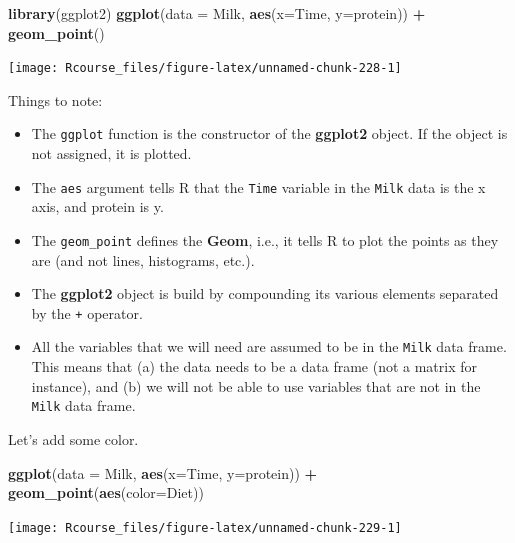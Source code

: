 \documentclass[]{book}
\newenvironment{Shaded}{\begin{snugshade}}{\end{snugshade}}
\newcommand{\KeywordTok}[1]{\textcolor[rgb]{0.13,0.29,0.53}{\textbf{#1}}}
\newcommand{\DataTypeTok}[1]{\textcolor[rgb]{0.13,0.29,0.53}{#1}}
\newcommand{\StringTok}[1]{\textcolor[rgb]{0.31,0.60,0.02}{#1}}
\newcommand{\OperatorTok}[1]{\textcolor[rgb]{0.81,0.36,0.00}{\textbf{#1}}}
\newcommand{\NormalTok}[1]{#1}
\providecommand{\tightlist}{%
  \setlength{\itemsep}{0pt}\setlength{\parskip}{0pt}}
\theoremstyle{definition}
\theoremstyle{definition}
\theoremstyle{definition}
\theoremstyle{remark}
\begin{document}
\begin{Shaded}
\begin{Highlighting}[]
\KeywordTok{library}\NormalTok{(ggplot2)}
\KeywordTok{ggplot}\NormalTok{(}\DataTypeTok{data =}\NormalTok{ Milk, }\KeywordTok{aes}\NormalTok{(}\DataTypeTok{x=}\NormalTok{Time, }\DataTypeTok{y=}\NormalTok{protein)) }\OperatorTok{+}
\StringTok{  }\KeywordTok{geom_point}\NormalTok{()}
\end{Highlighting}
\end{Shaded}

\texttt{[image: Rcourse\_files/figure-latex/unnamed-chunk-228-1]}

Things to note:

\begin{itemize}
\tightlist
\item
  The \texttt{ggplot} function is the constructor of the
  \textbf{ggplot2} object. If the object is not assigned, it is plotted.
\item
  The \texttt{aes} argument tells R that the \texttt{Time} variable in
  the \texttt{Milk} data is the x axis, and protein is y.
\item
  The \texttt{geom\_point} defines the \textbf{Geom}, i.e., it tells R
  to plot the points as they are (and not lines, histograms, etc.).
\item
  The \textbf{ggplot2} object is build by compounding its various
  elements separated by the \texttt{+} operator.
\item
  All the variables that we will need are assumed to be in the
  \texttt{Milk} data frame. This means that (a) the data needs to be a
  data frame (not a matrix for instance), and (b) we will not be able to
  use variables that are not in the \texttt{Milk} data frame.
\end{itemize}

Let's add some color.

\begin{Shaded}
\begin{Highlighting}[]
\KeywordTok{ggplot}\NormalTok{(}\DataTypeTok{data =}\NormalTok{ Milk, }\KeywordTok{aes}\NormalTok{(}\DataTypeTok{x=}\NormalTok{Time, }\DataTypeTok{y=}\NormalTok{protein)) }\OperatorTok{+}
\StringTok{  }\KeywordTok{geom_point}\NormalTok{(}\KeywordTok{aes}\NormalTok{(}\DataTypeTok{color=}\NormalTok{Diet))}
\end{Highlighting}
\end{Shaded}

\texttt{[image: Rcourse\_files/figure-latex/unnamed-chunk-229-1]}
\end{document}
